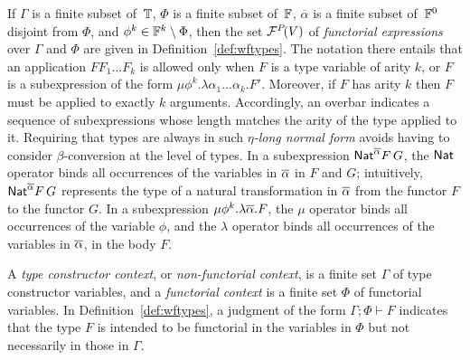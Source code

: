 \documentclass{lmcs}
\theoremstyle{plain}\newtheorem{satz}[thm]{Satz}
\begin{document}
If $\Gamma$ is a finite subset of\, $\mathbb{T}$, $\Phi$ is a finite
subset of\, $\mathbb{F}$, $\overline{\alpha}$ is a finite subset of\,
$\mathbb{F}^0$ disjoint from $\Phi$, and $\phi^k \in \mathbb{F}^k \setminus
\Phi$, then the set $\mathcal{F}^P\!(V)$ of {\em functorial expressions}
over $\Gamma$ and $\Phi$ are given in
Definition~\ref{def:wftypes}. The notation there entails that an
application $F F_1...F_k$ is allowed only when $F$ is a type variable
of arity $k$, or $F$ is a subexpression of the form $\mu
\phi^{k}.\lambda \alpha_1...\alpha_k.F'$. Moreover, if $F$ has arity
$k$ then $F$ must be applied to exactly $k$ arguments.  Accordingly,
an overbar indicates a sequence of subexpressions whose length matches
the arity of the type applied to it.  Requiring that types are always
in such \emph{$\eta$-long normal form} avoids having to consider
$\beta$-conversion at the level of types. In a subexpression
$\mathsf{Nat}^{\overline{\alpha}}F\,G$, the $\mathsf{Nat}$ operator binds all occurrences of
the variables in $\overline{\alpha}$ in $F$ and $G$; intuitively,
$\mathsf{Nat}^{\overline{\alpha}}F\,G$ represents the type of a natural
transformation in $\overline{\alpha}$ from the functor $F$ to the functor
$G$.  In a subexpression $\mu \phi^k.\lambda \overline{\alpha}.F$, the $\mu$
operator binds all occurrences of the variable $\phi$, and the
$\lambda$ operator binds all occurrences of the variables in
$\overline{\alpha}$, in the body $F$.

A {\em type constructor context}, or {\em non-functorial context}, is
a finite set $\Gamma$ of type constructor variables, and a {\em
  functorial context} is a finite set $\Phi$ of functorial
variables. In Definition~\ref{def:wftypes}, a judgment of the form
$\Gamma;\Phi \vdash F$ indicates that the type $F$ is intended to be
functorial in the variables in $\Phi$ but not necessarily in those in
$\Gamma$.
\end{document}

